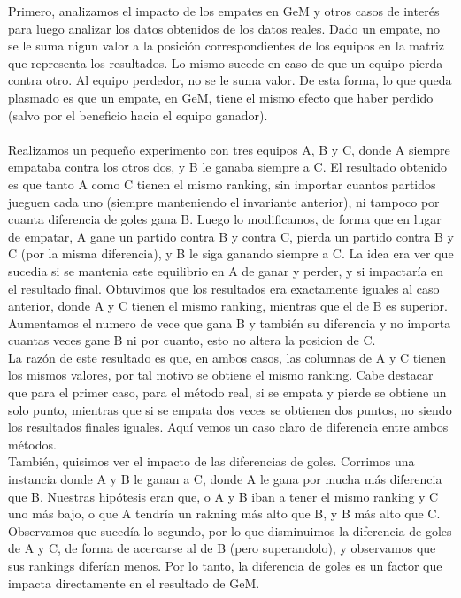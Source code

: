 Primero, analizamos el impacto de los empates en GeM y otros casos de interés para luego analizar los datos obtenidos de los datos reales. Dado un empate, no se le suma nigun valor a la posición correspondientes de los equipos en la matriz que representa los resultados. Lo mismo sucede en caso de que un equipo pierda contra otro. Al equipo perdedor, no se le suma valor. De esta forma, lo que queda plasmado es que un empate, en GeM, tiene el mismo efecto que haber perdido (salvo por el beneficio hacia el equipo ganador). \\ \\
Realizamos un pequeño experimento con tres equipos A, B y C, donde A siempre empataba contra los otros dos, y B le ganaba siempre a C. El resultado obtenido es que tanto A como C tienen el mismo ranking, sin importar cuantos partidos jueguen cada uno (siempre manteniendo el invariante anterior), ni tampoco por cuanta diferencia de goles gana B. Luego lo modificamos, de forma que en lugar de empatar, A gane un partido contra B y contra C, pierda un partido contra B y C (por la misma diferencia), y B le siga ganando siempre a C. La idea era ver que sucedia si se mantenia este equilibrio en A de ganar y perder, y si impactaría en el resultado final. Obtuvimos que los resultados era exactamente iguales al caso anterior, donde A y C tienen el mismo ranking, mientras que el de B es superior. Aumentamos el numero de vece que gana B y también su diferencia y no importa cuantas veces gane B ni por cuanto, esto no altera la posicion de C. \\
La razón de este resultado es que, en ambos casos, las columnas de A y C tienen los mismos valores, por tal motivo se obtiene el mismo ranking. Cabe destacar que para el primer caso, para el método real, si se empata y pierde se obtiene un solo punto, mientras que si se empata dos veces se obtienen dos puntos, no siendo los resultados finales iguales. Aquí vemos un caso claro de diferencia entre ambos métodos. \\
También, quisimos ver el impacto de las diferencias de goles. Corrimos una instancia donde A y B le ganan a C, donde A le gana por mucha más diferencia que B. Nuestras hipótesis eran que, o A y B iban a tener el mismo ranking y C uno más bajo, o que A tendría un rakning más alto que B, y B más alto que C. Observamos que sucedía lo segundo, por lo que disminuimos la diferencia de goles de A y C, de forma de acercarse al de B (pero superandolo), y observamos que sus rankings diferían menos. Por lo tanto, la diferencia de goles es un factor que impacta directamente en el resultado de GeM. \\
